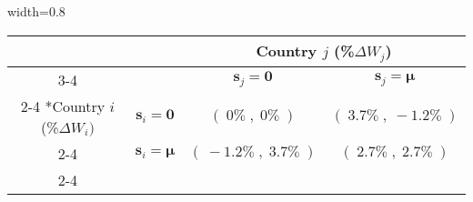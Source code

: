 \documentclass{article}
\begin{document}
\begin{table}
\centering
\vspace{-0.2in}
\begin{center}
\setlength{\extrarowheight}{4pt}
\begin{adjustbox}{width=0.8\textwidth}
\begin{tabular}{*{4}{c|}}
\multicolumn{2}{c}{} & \multicolumn{2}{c}{Country $j$ (\%$\Delta W_j$)} \\
\cline{3-4}
\multicolumn{1}{c}{} &  & $\textbf{s}_j=\textbf{0}$ & $\textbf{s}_j=\boldsymbol{\mu}$ \\
\cline{2-4}       \multirow{2}*{Country $i$ (\%$\Delta W_i)$}  &
$\textbf{s}_i=\textbf{0}$ & $(\; 0\% \; , \; 0\% \;) $ & $(\;
3.7\% \; , \;-1.2\% \;)$ \\ \cline{2-4}
& $\textbf{s}_i=\boldsymbol{\mu}$ & $(\;
-1.2\% \; , \;3.7\% \;)$ &  $(\;2.7\% \; , \;2.7\% \;)$ \\ \cline{2-4}
\end{tabular}
\end{adjustbox}
\end{center}

\end{table}
\end{document}
